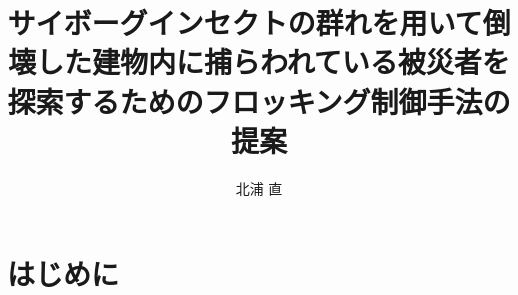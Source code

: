\documentclass[a4paper,11pt]{jarticle}
\title{サイボーグインセクトの群れを用いて倒壊した建物内に捕らわれている被災者を探索するためのフロッキング制御手法の提案}
\author{北浦 直}
\begin{document}
	\titlepage    %
	\abstract     %
	\keyword
	\tableofcontents    %
	\section{はじめに}
	
	\begin{thebibliography}{99}
		\item 
	\end{thebibliography}
\end{document}
